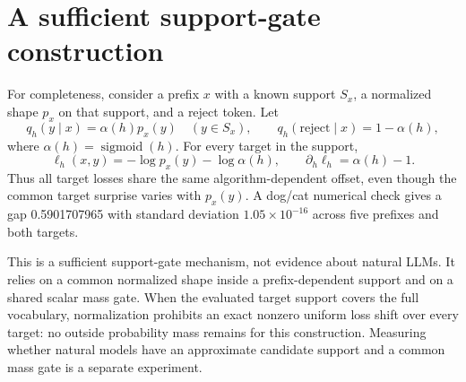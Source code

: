 \section{A sufficient support-gate construction}

For completeness, consider a prefix \(x\) with a known support \(S_x\), a normalized shape \(p_x\) on that support, and a reject token.  Let
\begin{equation}
 q_h(y\mid x)=\alpha(h)p_x(y)\quad (y\in S_x),\qquad
 q_h(\mathrm{reject}\mid x)=1-\alpha(h),
 \label{eq:support-gate}
\end{equation}
where \(\alpha(h)=\operatorname{sigmoid}(h)\).  For every target in the support,
\begin{equation}
 \ell_h(x,y)=-\log p_x(y)-\log\alpha(h),
 \qquad \partial_h\ell_h=\alpha(h)-1.
 \label{eq:gate-loss}
\end{equation}
Thus all target losses share the same algorithm-dependent offset, even though the common target surprise varies with \(p_x(y)\).  A dog/cat numerical check gives a gap 0.5901707965 with standard deviation \(1.05\times10^{-16}\) across five prefixes and both targets.

This is a sufficient support-gate mechanism, not evidence about natural LLMs.  It relies on a common normalized shape inside a prefix-dependent support and on a shared scalar mass gate.  When the evaluated target support covers the full vocabulary, normalization prohibits an exact nonzero uniform loss shift over every target: no outside probability mass remains for this construction.  Measuring whether natural models have an approximate candidate support and a common mass gate is a separate experiment.
